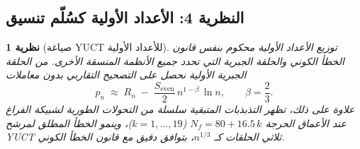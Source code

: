 \documentclass[11pt,a4paper]{article}
\newtheorem{theorem}{نظرية}
\begin{document}
	\subsection{النظرية 4: الأعداد الأولية كسُلّم تنسيق}
	
	\begin{theorem}[صياغة YUCT للأعداد الأولية]\label{thm:prime}
		توزيع الأعداد الأولية محكوم بنفس قانون الخطأ الكوني والحلقة الجبرية التي تحدد جميع الأنظمة المنسقة الأخرى. من الحلقة الجبرية الأولية نحصل على التصحيح التقاربي بدون معاملات
		\begin{equation}\label{eq:yuct-prime-theorem}
			\boxed{ p_n \;\approx\; R_n \;-\; \frac{S_{\mathrm{even}}}{2}\,
				n^{1-\beta}\,\ln n },
			\qquad \beta = \frac{2}{3}.
		\end{equation}
		علاوة على ذلك، تظهر التذبذبات المتبقية سلسلة من التحولات الطورية لشبيكة الفراغ عند الأعماق الحرجة \(N_f = 80 + 16.5\,k\) (\(k=1,\dots,19\))، وينمو الخطأ المطلق لمرشح YUCT ثلاثي الحلقات كـ \(n^{1/3}\)، بتوافق دقيق مع قانون الخطأ الكوني.
	\end{theorem}
	
\end{document}
